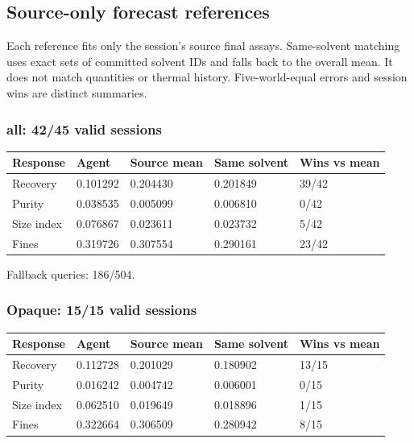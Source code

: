 \documentclass[10pt,a4paper]{article}
\begin{document}
\subsection{Source-only forecast references}\label{source-only-forecast-references}

Each reference fits only the session's source final assays. Same-solvent matching uses exact sets of committed solvent IDs and falls back to the overall mean. It does not match quantities or thermal history. Five-world-equal errors and session wins are distinct summaries.

\subsubsection{all: 42/45 valid sessions}\label{all-4245-valid-sessions}

{\def\LTcaptype{table} %
\small\begin{longtable}[]{@{}lllll@{}}
\toprule\noalign{}
Response & Agent & Source mean & Same solvent & Wins vs mean \\
\midrule\noalign{}
\endhead
\bottomrule\noalign{}
\endlastfoot
Recovery & 0.101292 & 0.204430 & 0.201849 & 39/42 \\
Purity & 0.038535 & 0.005099 & 0.006810 & 0/42 \\
Size index & 0.076867 & 0.023611 & 0.023732 & 5/42 \\
Fines & 0.319726 & 0.307554 & 0.290161 & 23/42 \\
\end{longtable}\normalsize
}

Fallback queries: 186/504.

\subsubsection{Opaque: 15/15 valid sessions}\label{opaque-1515-valid-sessions}

{\def\LTcaptype{table} %
\small\begin{longtable}[]{@{}lllll@{}}
\toprule\noalign{}
Response & Agent & Source mean & Same solvent & Wins vs mean \\
\midrule\noalign{}
\endhead
\bottomrule\noalign{}
\endlastfoot
Recovery & 0.112728 & 0.201029 & 0.180902 & 13/15 \\
Purity & 0.016242 & 0.004742 & 0.006001 & 0/15 \\
Size index & 0.062510 & 0.019649 & 0.018896 & 1/15 \\
Fines & 0.322664 & 0.306509 & 0.280942 & 8/15 \\
\end{longtable}\normalsize
}
\end{document}
